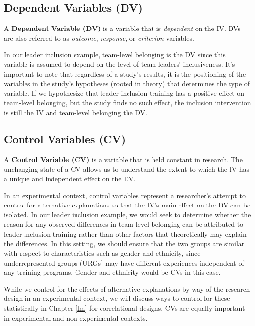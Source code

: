 \documentclass[
]{book}
\begin{document}
\hypertarget{dependent-variables-dv}{%
\subsection{Dependent Variables (DV)}\label{dependent-variables-dv}}

A \textbf{Dependent Variable (DV)} is a variable that is \emph{dependent} on the IV. DVs are also referred to as \emph{outcome}, \emph{response}, or \emph{criterion} variables.

In our leader inclusion example, team-level belonging is the DV since this variable is assumed to depend on the level of team leaders' inclusiveness. It's important to note that regardless of a study's results, it is the positioning of the variables in the study's hypotheses (rooted in theory) that determines the type of variable. If we hypothesize that leader inclusion training has a positive effect on team-level belonging, but the study finds no such effect, the inclusion intervention is still the IV and team-level belonging the DV.

\hypertarget{control-variables-cv}{%
\subsection{Control Variables (CV)}\label{control-variables-cv}}

A \textbf{Control Variable (CV)} is a variable that is held constant in research. The unchanging state of a CV allows us to understand the extent to which the IV has a unique and independent effect on the DV.

In an experimental context, control variables represent a researcher's attempt to control for alternative explanations so that the IV's main effect on the DV can be isolated. In our leader inclusion example, we would seek to determine whether the reason for any observed differences in team-level belonging can be attributed to leader inclusion training rather than other factors that theoretically may explain the differences. In this setting, we should ensure that the two groups are similar with respect to characteristics such as gender and ethnicity, since underrepresented groups (URGs) may have different experiences independent of any training programs. Gender and ethnicity would be CVs in this case.

While we control for the effects of alternative explanations by way of the research design in an experimental context, we will discuss ways to control for these statistically in Chapter \ref{lm} for correlational designs. CVs are equally important in experimental and non-experimental contexts.
\end{document}
